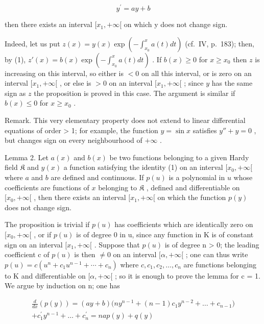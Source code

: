 \[
y ^ {\prime} = a y + b\tag{1}
\]

then there exists an interval \([x_{1}, +\infty[\) on which y does not change sign.

Indeed, let us put \(z(x) = y(x) \exp \left(-\int_{x_0}^x a(t)dt\right)\) (cf.~IV, p.~183); then, by (1), \(z'(x) = b(x) \exp \left(-\int_{x_0}^x a(t)dt\right)\) . If \(b(x) \geqslant 0\) for \(x \geqslant x_0\) then \(z\) is increasing on this interval, so either is \(< 0\) on all this interval, or is zero on an interval \([x_1, +\infty[\) , or else is \(> 0\) on an interval \([x_1, +\infty[\) ; since \(y\) has the same sign as \(z\) the proposition is proved in this case. The argument is similar if \(b(x) \leqslant 0\) for \(x \geqslant x_0\) .

Remark. This very elementary property does not extend to linear differential equations of order \textgreater{} 1; for example, the function \(y = \sin x\) satisfies \(y'' + y = 0\) , but changes sign on every neighbourhood of \(+\infty\) .

Lemma 2. Let \(a(x)\) and \(b(x)\) be two functions belonging to a given Hardy field \(\mathfrak{K}\) and \(y(x)\) a function satisfying the identity (1) on an interval \([x_0, +\infty[\) where \(a\) and \(b\) are defined and continuous. If \(p(u)\) is a polynomial in \(u\) whose coefficients are functions of \(x\) belonging to \(\mathfrak{K}\) , defined and differentiable on \([x_0, +\infty[\) , then there exists an interval \([x_1, +\infty[\) on which the function \(p(y)\) does not change sign.

The proposition is trivial if \(p(u)\) has coefficients which are identically zero on \([x_{0}, +\infty[\) , or if \(p(u)\) is of degree 0 in u, since any function in K is of constant sign on an interval \([x_{1}, +\infty[\) . Suppose that \(p(u)\) is of degree n \textgreater{} 0; the leading coefficient c of \(p(u)\) is then \(\neq 0\) on an interval \([\alpha, +\infty[\) ; one can thus write \(p(u) = c(u^{n} + c_{1}u^{n-1} + \cdots + c_{n})\) where \(c, c_{1}, c_{2}, \ldots, c_{n}\) are functions belonging to K and differentiable on \([\alpha, +\infty[\) ; so it is enough to prove the lemma for c = 1. We argue by induction on n; one has

\[
\begin{array}{c} \frac {d}{d x} (p (y)) = (a y + b) \bigl (n y ^ {n - 1} + (n - 1) c _ {1} y ^ {n - 2} + \dots + c _ {n - 1} \bigr) \\ + c _ {1} ^ {\prime} y ^ {n - 1} + \dots + c _ {n} ^ {\prime} = n a p (y) + q (y) \end{array}
\]

